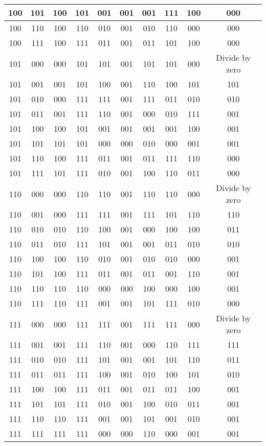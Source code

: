 \documentclass{aiaa-tc}
\begin{document}
\begin{center}
\begin{tabular}{ |c|c|c|c|c|c|c|c|c|c| }
     100 & 101 & 100 & 101 & 001 & 001 & 001 & 111 & 100 & 000\\ \hline
     100 & 110 & 100 & 110 & 010 & 001 & 010 & 110 & 000 & 000\\ \hline
     100 & 111 & 100 & 111 & 011 & 001 & 011 & 101 & 100 & 000\\ \hline
     101 & 000 & 000 & 101 & 101 & 001 & 101 & 101 & 000 & Divide by zero\\ \hline
     101 & 001 & 001 & 101 & 100 & 001 & 110 & 100 & 101 & 101\\ \hline
     101 & 010 & 000 & 111 & 111 & 001 & 111 & 011 & 010 & 010\\ \hline
     101 & 011 & 001 & 111 & 110 & 001 & 000 & 010 & 111 & 001\\ \hline
     101 & 100 & 100 & 101 & 001 & 001 & 001 & 001 & 100 & 001\\ \hline
     101 & 101 & 101 & 101 & 000 & 000 & 010 & 000 & 001 & 001\\ \hline
     101 & 110 & 100 & 111 & 011 & 001 & 011 & 111 & 110 & 000\\ \hline
     101 & 111 & 101 & 111 & 010 & 001 & 100 & 110 & 011 & 000\\ \hline
     110 & 000 & 000 & 110 & 110 & 001 & 110 & 110 & 000 & Divide by zero\\ \hline
     110 & 001 & 000 & 111 & 111 & 001 & 111 & 101 & 110 & 110\\ \hline
     110 & 010 & 010 & 110 & 100 & 001 & 000 & 100 & 100 & 011\\ \hline
     110 & 011 & 010 & 111 & 101 & 001 & 001 & 011 & 010 & 010\\ \hline
     110 & 100 & 100 & 110 & 010 & 001 & 010 & 010 & 000 & 001\\ \hline
     110 & 101 & 100 & 111 & 011 & 001 & 011 & 001 & 110 & 001\\ \hline
     110 & 110 & 110 & 110 & 000 & 000 & 100 & 000 & 100 & 001\\ \hline
     110 & 111 & 110 & 111 & 001 & 001 & 101 & 111 & 010 & 000\\ \hline
     111 & 000 & 000 & 111 & 111 & 001 & 111 & 111 & 000 & Divide by zero\\ \hline
     111 & 001 & 001 & 111 & 110 & 001 & 000 & 110 & 111 & 111\\ \hline
     111 & 010 & 010 & 111 & 101 & 001 & 001 & 101 & 110 & 011\\ \hline
     111 & 011 & 011 & 111 & 100 & 001 & 010 & 100 & 101 & 010\\ \hline
     111 & 100 & 100 & 111 & 011 & 001 & 011 & 011 & 100 & 001\\ \hline
     111 & 101 & 101 & 111 & 010 & 001 & 100 & 010 & 011 & 001\\ \hline
     111 & 110 & 110 & 111 & 001 & 001 & 101 & 001 & 010 & 001\\ \hline
     111 & 111 & 111 & 111 & 000 & 000 & 110 & 000 & 001 & 001\\ \hline
     \end{tabular}
     \end{center}
\end{document}
